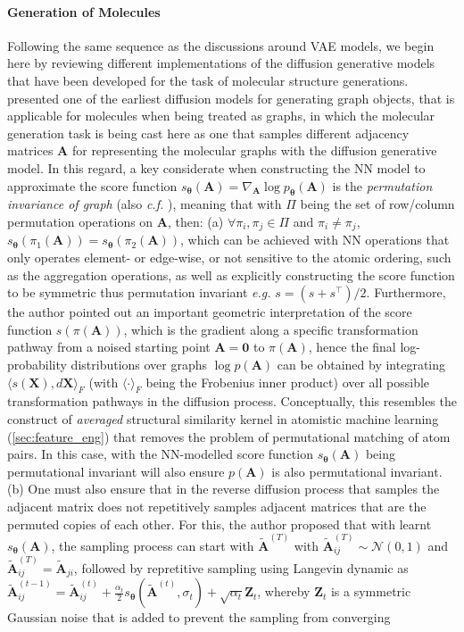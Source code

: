 \paragraph{\textbf{Generation of Molecules}}
 Following the same sequence as the discussions around VAE models, we begin here by reviewing different implementations of the diffusion generative models that have been developed for the task of molecular structure generations. \citet{niu2020permutation} presented one of the earliest diffusion models for generating graph objects, that is applicable for molecules when being treated as graphs, in which the molecular generation task is being cast here as one that samples different adjacency matrices $\bm{A}$ for representing the molecular graphs with the diffusion generative model. In this regard, a key considerate when constructing the NN model to approximate the score function $s_{\boldsymbol{\theta}}(\bm{A})=\nabla_{\bm{A}}\log p_{\boldsymbol{\theta}}(\bm{A})$ is the \emph{permutation invariance of graph} (also \emph{c.f.} \citet{simonovsky2018graphvae}), meaning that with $\Pi$ being the set of row/column permutation operations on $\bm{A}$, then: (a) $\forall \pi_i,\pi_j\in\Pi$ and $\pi_i\neq\pi_j$, $s_{\boldsymbol{\theta}}(\pi_1(\bm{A}))=s_{\boldsymbol{\theta}}(\pi_2(\bm{A}))$, which can be achieved with NN operations that only operates element- or edge-wise, or not sensitive to the atomic ordering, such as the aggregation operations, as well as explicitly constructing the score function to be symmetric thus permutation invariant \emph{e.g.} $s=\left(s+s^\top\right)/2$. Furthermore, the author pointed out an important geometric interpretation of the score function $s(\pi(\bm{A}))$, which is the gradient along a specific transformation pathway from a noised starting point $\bm{A}=\bm{0}$ to $\pi(\bm{A})$,  hence the final log-probability distributions over graphs $\log p(\bm{A})$ can be obtained by integrating $\langle s(\bm{X}),d\bm{X}\rangle_F$ (with $\langle\cdot\rangle_F$ being the  Frobenius inner product)  over all possible transformation pathways in the diffusion process. Conceptually, this resembles the construct of \emph{averaged} structural similarity kernel\cite{de2016comparing} in atomistic machine learning (\cref{sec:feature_eng}) that removes the problem of permutational matching of atom pairs. In this case, with the NN-modelled score function $s_{\boldsymbol{\theta}}(\bm{A})$ being permutational invariant will also ensure $p(\bm{A})$ is also permutational invariant.  (b) One must also ensure that in the reverse diffusion process that samples the adjacent matrix does not repetitively samples adjacent matrices that are the permuted copies of each other. For this, the author proposed that with learnt $s_{\boldsymbol{\theta}}(\bm{A})$, the sampling process can start with $\tilde{\bm{A}}^{(T)}$ with $\tilde{\bm{A}}_{ij}^{(T)}\sim\mathcal{N}(0,1)$ and $\tilde{\bm{A}}_{ij}^{(T)}=\tilde{\bm{A}}_{ji}$, followed by repretitive sampling using Langevin dynamic as $\tilde{\bm{A}}_{ij}^{(t-1)}=\tilde{\bm{A}}_{ij}^{(t)}+\frac{\alpha_t}{2}s_{\boldsymbol{\theta}}(\tilde{\bm{A}}^{(t)},\sigma_t)+\sqrt{\alpha_t}\bm{Z}_t$, whereby $\bm{Z}_t$ is a symmetric Gaussian noise that is added to prevent the sampling from converging 